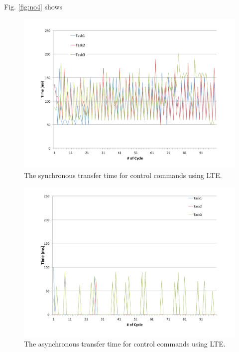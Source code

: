 Fig. \ref{fig:no4} shows 

\begin{figure}[!t]
 \centering
 \includegraphics[width=0.8\hsize]{fig/No2_Andrive_serv_cycle_LTE.pdf}
 \caption{The synchronous transfer time for control commands using LTE.}
 \label{fig:no2}
\end{figure}

\begin{figure}[!t]
 \centering
 \includegraphics[width=0.8\hsize]{fig/No5_Andrive_serv_cycle_LTE_only_send.pdf}
 \caption{The asynchronous transfer time for control commands using LTE.}
 \label{fig:no5}
\end{figure}

